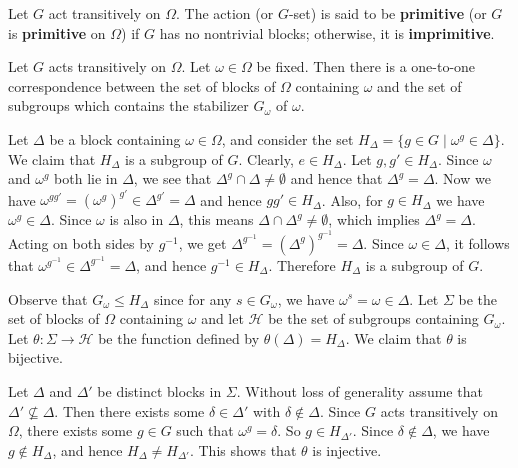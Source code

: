 \begin{definition}
	Let $G$ act transitively on $\Omega$. The action (or $G$-set) is said to be \textbf{primitive} (or $G$ is \textbf{primitive} on $\Omega$) if $G$ has no nontrivial blocks; otherwise, it is \textbf{imprimitive}.
\end{definition}

\begin{proposition} \label{prop-block-and-stab}
	Let $G$ acts transitively on $\Omega$. Let $\omega\in \Omega$ be fixed. Then there is a one-to-one correspondence between the set of blocks of $\Omega$ containing $\omega$ and the set of subgroups which contains the stabilizer $G_\omega$ of $\omega$.
\end{proposition}
\begin{sketch}
	Let $\Delta$ be a block containing $\omega \in \Omega$, and consider the set $H_\Delta = \{g \in G \mid \omega^g \in \Delta\}$. We claim that $H_\Delta$ is a subgroup of  $G$. Clearly, $e \in H_\Delta$. Let $g,g' \in H_\Delta$. Since $\omega$ and $\omega^g$ both lie in $\Delta$, we see that $\Delta^g \cap \Delta\neq \emptyset$ and hence that $\Delta^g = \Delta$. Now we have $\omega^{gg'} = (\omega^g)^{g'} \in \Delta^{g'} = \Delta$ and hence $gg' \in H_\Delta$. Also, for $g \in H_\Delta$ we have $\omega^g \in \Delta$. Since $\omega$ is also in $\Delta$, this means $\Delta \cap \Delta^g \neq \emptyset$, which implies $\Delta^g = \Delta$. Acting on both sides by $g^{-1}$, we get $\Delta^{g^{-1}} = (\Delta^g)^{g^{-1}} = \Delta$. Since $\omega \in \Delta$, it follows that $\omega^{g^{-1}} \in \Delta^{g^{-1}} = \Delta$, and hence $g^{-1} \in H_\Delta$. Therefore $H_\Delta$ is a subgroup of $G$.
	
	Observe that $G_\omega \le H_\Delta$ since for any $s \in G_\omega$, we have $\omega^s=\omega \in \Delta$.  Let $\Sigma$ be the set of blocks of $\Omega$ containing $\omega$ and let $\mathcal{H}$ be the set of subgroups containing $G_\omega$. Let $\theta:\Sigma\rightarrow \mathcal{H}$ be the function defined by $\theta(\Delta)=H_\Delta$. We claim that $\theta$ is bijective.
	
	Let $\Delta$ and $\Delta'$ be distinct blocks in $\Sigma$. Without loss of generality assume that $\Delta'\not\subseteq \Delta$. Then there exists some  $\delta \in \Delta'$ with $\delta \notin \Delta$. Since $G$ acts transitively on $\Omega$, there exists some $g \in G$ such that $\omega^g = \delta$. So $g \in H_{\Delta'}$. Since $\delta\not\in \Delta$, we have $g \notin H_\Delta$, and hence $H_\Delta \ne H_{\Delta'}$. This shows that $\theta$ is injective.
	

\end{sketch}
